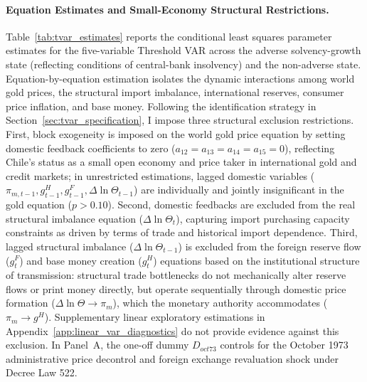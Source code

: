 \paragraph{Equation Estimates and Small-Economy Structural Restrictions.}
Table~\ref{tab:tvar_estimates} reports the conditional least squares parameter estimates for the five-variable Threshold VAR across the adverse solvency-growth state (reflecting conditions of central-bank insolvency) and the non-adverse state. Equation-by-equation estimation isolates the dynamic interactions among world gold prices, the structural import imbalance, international reserves, consumer price inflation, and base money. Following the identification strategy in Section~\ref{sec:tvar_specification}, I impose three structural exclusion restrictions. First, block exogeneity is imposed on the world gold price equation by setting domestic feedback coefficients to zero ($a_{12} = a_{13} = a_{14} = a_{15} = 0$), reflecting Chile's status as a small open economy and price taker in international gold and credit markets; in unrestricted estimations, lagged domestic variables ($\pi_{m,t-1}, g^H_{t-1}, g^F_{t-1}, \Delta \ln \Theta_{t-1}$) are individually and jointly insignificant in the gold equation ($p > 0.10$). Second, domestic feedbacks are excluded from the real structural imbalance equation ($\Delta \ln \Theta_t$), capturing import purchasing capacity constraints as driven by terms of trade and historical import dependence. Third, lagged structural imbalance ($\Delta \ln \Theta_{t-1}$) is excluded from the foreign reserve flow ($g^F_t$) and base money creation ($g^H_t$) equations based on the institutional structure of transmission: structural trade bottlenecks do not mechanically alter reserve flows or print money directly, but operate sequentially through domestic price formation ($\Delta \ln \Theta \to \pi_m$), which the monetary authority accommodates ($\pi_m \to g^H$). Supplementary linear exploratory estimations in Appendix~\ref{app:linear_var_diagnostics} do not provide evidence against this exclusion. In Panel~A, the one-off dummy $D_{oct73}$ controls for the October 1973 administrative price decontrol and foreign exchange revaluation shock under Decree Law 522.

